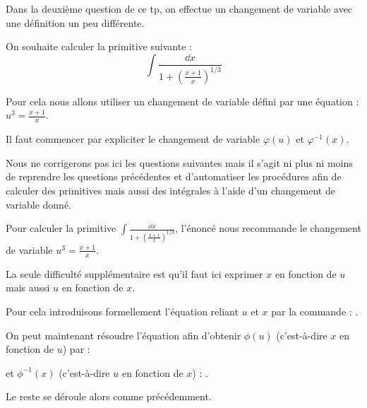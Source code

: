 \diapo

Dans la deuxième question de ce tp, on effectue un changement de variable avec une définition un peu différente.%

On souhaite calculer la primitive suivante : 
$$\displaystyle\int \frac{\dd x}{1+\left(\frac{x+1}{x}\right)^{1/3}}$$

Pour cela nous allons utiliser un changement de variable défini par une équation : $u^3 = \frac{x+1}{x}$.
    
Il faut commencer par expliciter le changement de variable $\varphi(u)$ et $\varphi^{-1}(x)$.

Nous ne corrigerons pas ici les questions suivantes mais il s'agit ni plus ni moins de reprendre 
les questions précédentes et d'automatiser les procédures afin 
 de calculer des primitives mais aussi des intégrales à l'aide d'un changement de variable donné.

%
%



\diapo

Pour calculer la primitive $\int \frac{\dd x}{1+\left(\frac{x+1}{x}\right)^{1/3}}$, l'énoncé  nous recommande le changement de variable $u^3 = \frac{x+1}{x}$.
  
La seule difficulté supplémentaire est qu'il faut ici exprimer $x$ en fonction de $u$ 
mais aussi $u$ en fonction de $x$.

Pour cela introduisons formellement l'équation reliant $u$ et $x$ par la commande : 
  . 
  
  
  On peut maintenant résoudre l'équation afin d'obtenir
  $\phi(u)$ (c'est-à-dire $x$ en fonction de $u$) par :  
  
  et $\phi^{-1}(x)$ (c'est-à-dire $u$ en fonction de $x$) : 
  .
  
  Le reste se déroule alors comme précédemment.




